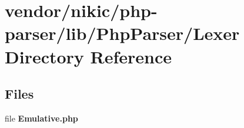 \section{vendor/nikic/php-\/parser/lib/\+Php\+Parser/\+Lexer Directory Reference}
\label{dir_a2f711b33d83dfbc6847a578e9a81127}
\subsection*{Files}
\begin{DoxyCompactItemize}
\item 
file {\bf Emulative.\+php}
\end{DoxyCompactItemize}
